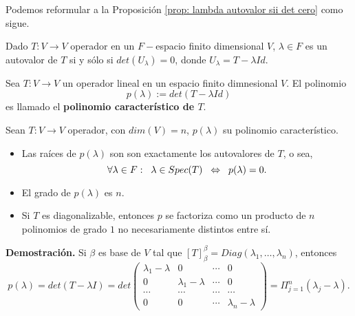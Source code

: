 Podemos reformular a la Proposición 
\ref{prop: lambda autovalor sii det cero} como sigue.
\begin{cor}
Dado $T: V \longrightarrow V$ operador en 
un $F-$espacio finito dimensional $V$,
$\lambda \in F$ es un autovalor de $T$ si y sólo si 
$det(U_{\lambda}) = 0$, donde $U_{\lambda} = T - \lambda Id$.
\end{cor}


\begin{defi}
	\label{def: polinomio caracteristico}
	Sea $T: V \longrightarrow V$ un operador lineal en un espacio
	finito dimnesional $V$. 
	El polinomio
	\[
	p(\lambda) := det(T - \lambda Id)
	\]
	es llamado el \textbf{polinomio característico de $T$}.
\end{defi}

\begin{prop}
	\label{prop: propiedades del pol caracteristico}
	Sean $T : V \longrightarrow V$ operador, con $dim(V) = n$, 
	$p(\lambda)$ su polinomio característico.
	\begin{itemize}
		\item Las raíces de $p(\lambda)$ son 
		son exactamente los autovalores de $T$, o sea, 
		\[
		\forall \lambda \in F: \hspace{0.2cm}
		\lambda \in Spec(T) \hspace{0.2cm}
		\Leftrightarrow \hspace{0.2cm} p(\lambda) = 0.
		\]
		\item El grado de $p(\lambda)$ es $n$.
		\item Si $T$ es diagonalizable, entonces $p$ se factoriza como
		un producto de $n$ polinomios de grado $1$ no necesariamente distintos
		entre sí.
	\end{itemize}
\end{prop}
\textbf{Demostración.}
Si $\beta$ es base de $V$ tal que 
$[T]_{\beta}^{\beta} = Diag(\lambda_{1}, \ldots , \lambda_{n})$,
entonces 
\[
p(\lambda) = det(T- \lambda I) = det
\begin{pmatrix}
	\lambda_{1} - \lambda & 0 & \cdots & 0 \\
	0 & \lambda_{1} - \lambda & \cdots & 0 \\
	\cdots & \cdots & \cdots & \cdots \\
	0 & 0 & \cdots & \lambda_{n} - \lambda
\end{pmatrix}
= \Pi_{j=1}^{n} (\lambda_{j} - \lambda).
\]

